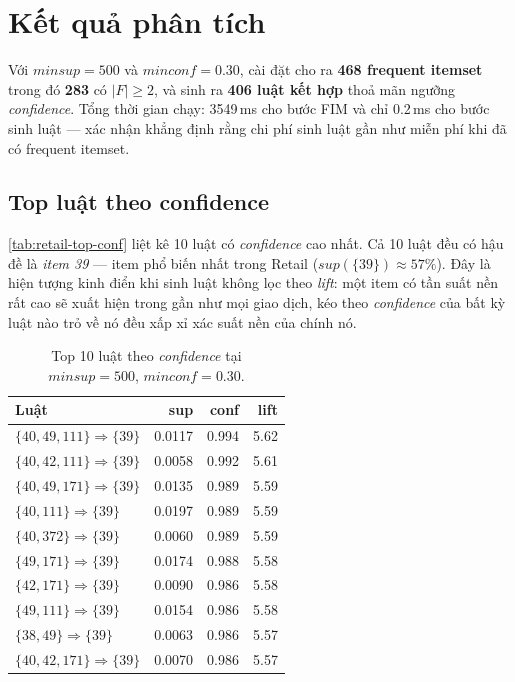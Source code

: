 \section{Kết quả phân tích}
\label{sec:mba-results}

Với $\textit{minsup} = 500$ và $\textit{minconf} = 0.30$, cài đặt cho ra \textbf{468 frequent itemset} trong đó \textbf{283} có $|F| \ge 2$, và sinh ra \textbf{406 luật kết hợp} thoả mãn ngưỡng \textit{confidence}. Tổng thời gian chạy: 3549\,ms cho bước FIM và chỉ 0.2\,ms cho bước sinh luật --- xác nhận khẳng định rằng chi phí sinh luật gần như miễn phí khi đã có frequent itemset.

\subsection{Top luật theo confidence}

\autoref{tab:retail-top-conf} liệt kê 10 luật có \textit{confidence} cao nhất. Cả 10 luật đều có hậu đề là \emph{item 39} --- item phổ biến nhất trong Retail ($\textit{sup}(\{39\}) \approx 57\%$). Đây là hiện tượng kinh điển khi sinh luật không lọc theo \textit{lift}: một item có tần suất nền rất cao sẽ xuất hiện trong gần như mọi giao dịch, kéo theo \textit{confidence} của bất kỳ luật nào trỏ về nó đều xấp xỉ xác suất nền của chính nó.

\begin{table}[htbp]
    \centering
    \caption{Top 10 luật theo \textit{confidence} tại $\textit{minsup} = 500$, $\textit{minconf} = 0.30$.}
    \label{tab:retail-top-conf}
    \begin{tabular}{l|r|r|r}
        \hline
        \textbf{Luật} & \textbf{sup} & \textbf{conf} & \textbf{lift} \\ \hline
        $\{40, 49, 111\} \Rightarrow \{39\}$ & 0.0117 & 0.994 & 5.62 \\
        $\{40, 42, 111\} \Rightarrow \{39\}$ & 0.0058 & 0.992 & 5.61 \\
        $\{40, 49, 171\} \Rightarrow \{39\}$ & 0.0135 & 0.989 & 5.59 \\
        $\{40, 111\}      \Rightarrow \{39\}$ & 0.0197 & 0.989 & 5.59 \\
        $\{40, 372\}      \Rightarrow \{39\}$ & 0.0060 & 0.989 & 5.59 \\
        $\{49, 171\}      \Rightarrow \{39\}$ & 0.0174 & 0.988 & 5.58 \\
        $\{42, 171\}      \Rightarrow \{39\}$ & 0.0090 & 0.986 & 5.58 \\
        $\{49, 111\}      \Rightarrow \{39\}$ & 0.0154 & 0.986 & 5.58 \\
        $\{38, 49\}       \Rightarrow \{39\}$ & 0.0063 & 0.986 & 5.57 \\
        $\{40, 42, 171\}  \Rightarrow \{39\}$ & 0.0070 & 0.986 & 5.57 \\ \hline
    \end{tabular}
\end{table}

